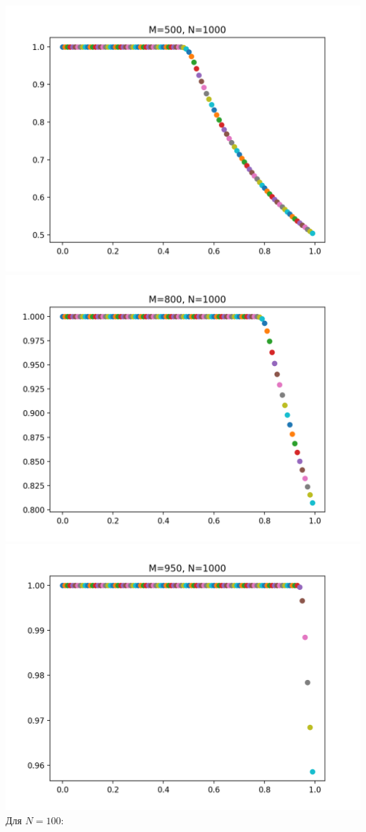 \includegraphics[scale=0.5]{img/1000_500}
\includegraphics[scale=0.5]{img/1000_800}
\includegraphics[scale=0.5]{img/1000_950}
\skip
Для $N=100$:

